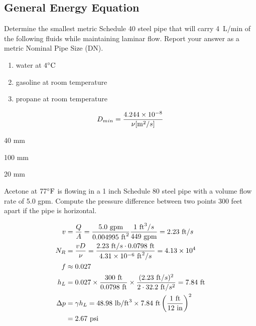 \documentclass[multi,preview,varwidth=false,border=5,12pt]{standalone}
\begin{document}
\begin{center}
\section*{General Energy Equation}
\end{center}

\begin{question}

Determine the smallest metric Schedule 40 steel pipe that will carry 4~L/min of the following fluids while maintaining laminar flow.  Report your answer as a metric Nominal Pipe Size (DN).

\begin{enumerate}

\item water at $4^\circ\mathrm{C}$

\item gasoline at room temperature

\item propane at room temperature

\end{enumerate}


\begin{solution}
$$
D_{min}=\frac{4.244\times 10^{-8}}{\nu [\mathrm{m}^2/s]}
$$

40 mm

100 mm

20 mm

\end{solution}

\end{question}

\begin{question}
Acetone at $77^\circ\mathrm{F}$ is flowing in a 1 inch Schedule 80 steel pipe with a volume flow rate of 5.0 gpm. Compute the pressure difference between two points 300 feet apart if the pipe is horizontal.

\begin{solution}

\begin{align*}
v&=\frac{Q}{A}=\frac{5.0~\textrm{gpm}}{0.004995~\mathrm{ft}^2}\frac{1~\mathrm{ft}^3/s}{449~ \textrm{gpm}}=2.23~\mathrm{ft}/s \\
N_R&=\frac{vD}{\nu}=\frac{2.23~\mathrm{ft}/s\cdot 0.0798~\mathrm{ft}}{4.31\times 10^{-6}~\mathrm{ft}^2/s}=4.13\times 10^4 \\
f&\approx 0.027 \\
h_L&=0.027\times \frac{300~\mathrm{ft}}{0.0798~\mathrm{ft}}\times \frac{(2.23~\mathrm{ft}/s)^2}{2\cdot 32.2~\mathrm{ft}/s^2}=7.84~\mathrm{ft} \\
\Delta p&=\gamma h_L = 48.98~\mathrm{lb}/\mathrm{ft}^3\times 7.84~\mathrm{ft} \left(\frac{1~\mathrm{ft}}{12~\mathrm{in}}\right)^2\\
&=2.67~\mathrm{psi}
\end{align*}

\end{solution}

\end{question}
\end{document}
